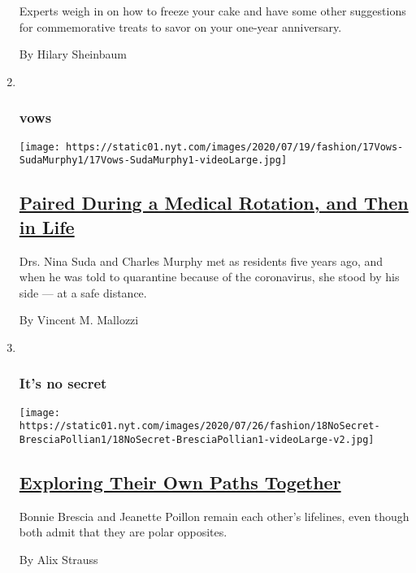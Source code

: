 \begin{enumerate}
  Experts weigh in on how to freeze your cake and have some other
  suggestions for commemorative treats to savor on your one-year
  anniversary.

  By Hilary Sheinbaum
\item ~
  \hypertarget{vows-2}{%
  \subsubsection{vows}\label{vows-2}}

  \texttt{[image: https://static01.nyt.com/images/2020/07/19/fashion/17Vows-SudaMurphy1/17Vows-SudaMurphy1-videoLarge.jpg]}

  \hypertarget{paired-during-a-medical-rotation-and-then-in-life}{%
  \subsection{\texorpdfstring{\href{/2020/07/17/fashion/weddings/paired-during-a-medical-rotation-and-then-in-life.html}{Paired
  During a Medical Rotation, and Then in
  Life}}{Paired During a Medical Rotation, and Then in Life}}\label{paired-during-a-medical-rotation-and-then-in-life}}

  Drs. Nina Suda and Charles Murphy met as residents five years ago, and
  when he was told to quarantine because of the coronavirus, she stood
  by his side --- at a safe distance.

  By Vincent M. Mallozzi
\item ~
  \hypertarget{its-no-secret}{%
  \subsubsection{It's no secret}\label{its-no-secret}}

  \texttt{[image: https://static01.nyt.com/images/2020/07/26/fashion/18NoSecret-BresciaPollian1/18NoSecret-BresciaPollian1-videoLarge-v2.jpg]}

  \hypertarget{exploring-their-own-paths-together}{%
  \subsection{\texorpdfstring{\href{/2020/07/18/fashion/weddings/exploring-their-own-paths-together.html}{Exploring
  Their Own Paths
  Together}}{Exploring Their Own Paths Together}}\label{exploring-their-own-paths-together}}

  Bonnie Brescia and Jeanette Poillon remain each other's lifelines,
  even though both admit that they are polar opposites.

  By Alix Strauss
\end{enumerate}

